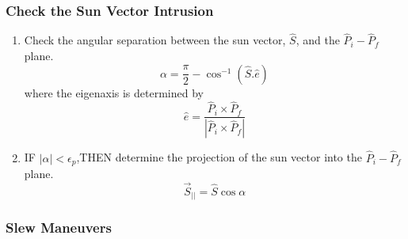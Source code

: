 \documentclass[letterpaper, preprint, paper,11pt]{AAS}	%
\begin{document}
	\subsubsection{Check the Sun Vector Intrusion}
	\begin{enumerate}
		\item Check the angular separation between the sun vector, $\hat{S}$, and the $\hat{P}_i-\hat{P}_f$ plane.
		\begin{equation}
		\alpha=\frac{\pi}{2}-\cos^{-1}(\hat{S}.\hat{e})
		\end{equation}
		where the eigenaxis is determined by
		\begin{equation}\label{eaxis}
		\hat{e}=\frac{\hat{P}_i\times\hat{P}_f}{|\hat{P}_i\times \hat{P}_f|}
		\end{equation} 
		
		\item IF $|\alpha|<\epsilon_p$,THEN determine the projection of the sun vector into the $\hat{P}_i-\hat{P}_f$ plane.
		\begin{equation}\label{Sbar}
		\vec{S}_{||}=\hat{S}\cos\alpha
		\end{equation}
	\end{enumerate}
	
	
	\subsubsection{Slew Maneuvers}
	
\end{document}
